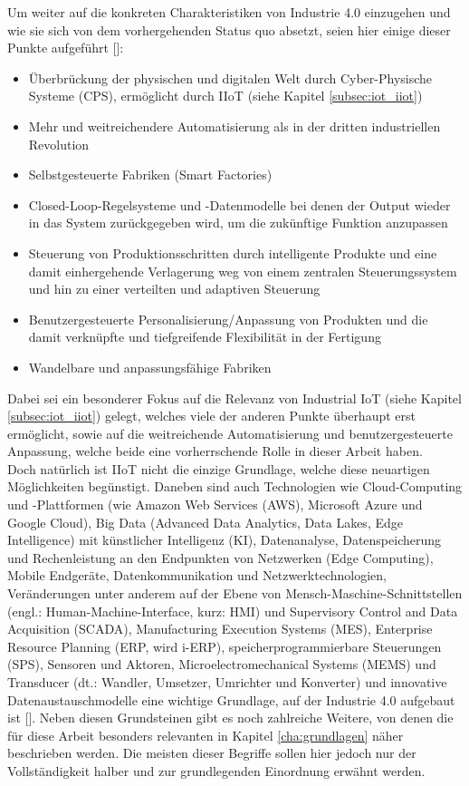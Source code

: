 Um weiter auf die konkreten Charakteristiken von Industrie 4.0 einzugehen und wie sie sich von dem vorhergehenden Status quo absetzt, seien hier einige dieser Punkte aufgeführt [\cite{industrie40explained}]:
\begin{itemize}
    \item Überbrückung der physischen und digitalen Welt durch Cyber-Physische Systeme (CPS), ermöglicht durch IIoT (siehe Kapitel \ref{subsec:iot_iiot})
    \item Mehr und weitreichendere Automatisierung als in der dritten industriellen Revolution
    \item Selbstgesteuerte Fabriken (Smart Factories)
    \item Closed-Loop-Regelsysteme und -Datenmodelle bei denen der Output wieder in das System zurückgegeben wird, um die zukünftige Funktion anzupassen
    \item Steuerung von Produktionsschritten durch intelligente Produkte und eine damit einhergehende Verlagerung weg von einem zentralen Steuerungssystem und hin zu einer verteilten und adaptiven Steuerung
    \item Benutzergesteuerte Personalisierung/Anpassung von Produkten und die damit verknüpfte und tiefgreifende Flexibilität in der Fertigung
    \item Wandelbare und anpassungsfähige Fabriken
\end{itemize}

Dabei sei ein besonderer Fokus auf die Relevanz von Industrial IoT (siehe Kapitel \ref{subsec:iot_iiot}) gelegt, welches viele der anderen Punkte überhaupt erst ermöglicht, sowie auf die weitreichende Automatisierung und benutzergesteuerte Anpassung, welche beide eine vorherrschende Rolle in dieser Arbeit haben.\\
Doch natürlich ist IIoT nicht die einzige Grundlage, welche diese neuartigen Möglichkeiten begünstigt. Daneben sind auch Technologien wie Cloud-Computing und -Plattformen (wie Amazon Web Services (AWS), Microsoft Azure und Google Cloud), Big Data (Advanced Data Analytics, Data Lakes, Edge Intelligence) mit künstlicher Intelligenz (KI), Datenanalyse, Datenspeicherung und Rechenleistung an den Endpunkten von Netzwerken (Edge Computing), Mobile Endgeräte, Datenkommunikation und Netzwerktechnologien, Veränderungen unter anderem auf der Ebene von Mensch-Maschine-Schnittstellen (engl.: Human-Machine-Interface, kurz: HMI) und Supervisory Control and Data Acquisition (SCADA), Manufacturing Execution Systems (MES), Enterprise Resource Planning (ERP, wird i-ERP), speicherprogrammierbare Steuerungen (SPS), Sensoren und Aktoren, Microelectromechanical Systems (MEMS) und Transducer (dt.: Wandler, Umsetzer, Umrichter und Konverter) und innovative Datenaustauschmodelle eine wichtige Grundlage, auf der Industrie 4.0 aufgebaut ist [\cite{industrie40explained}]. Neben diesen Grundsteinen gibt es noch zahlreiche Weitere, von denen die für diese Arbeit besonders relevanten in Kapitel \ref{cha:grundlagen} näher beschrieben werden. Die meisten dieser Begriffe sollen hier jedoch nur der Vollständigkeit halber und zur grundlegenden Einordnung erwähnt werden.

